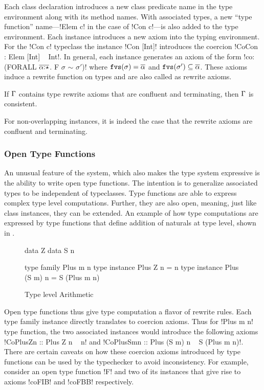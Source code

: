 \documentclass[screen,nonacm]{acmart}
\begin{document}
Each class declaration introduces a new class predicate name in the type environment along with its method names. With associated types, a new ``type function'' name---!Elem c! in the case of !Con c!---is also added to the type environment.
Each instance introduces a new axiom into the typing environment. For the !Con c! typeclass the instance !Con [Int]! introduces the coercion !CoCon : Elem [Int] ~ Int!. In general, each instance generates an axiom of the form !co: (FORALL $\overline{\alpha{:}\star}$. F $\sigma$ $\sim$ $\sigma'$)! where $\texttt{fvs}(\sigma) = \overline{\alpha}$
and $\texttt{fvs}(\sigma') \subseteq \overline{\alpha}$. These axioms induce a rewrite function on types and are also called as rewrite axioms.

\begin{theorem}
If $\Gamma$ contains type rewrite axioms that are confluent and terminating, then $\Gamma$ is consistent.
\end{theorem}
For non-overlapping instances, it is indeed the case that the rewrite axioms are confluent and terminating.

\subsubsection{Open Type Functions}\label{sec:fc-encodes-opentypefun}
An unusual feature of the system, which also makes the type system expressive is the ability to write open type functions. The intention is to generalize associated types to be independent of typeclasses. Type functions are able to express complex type level computations. Further, they are also open, meaning, just like class instances, they can be extended. An example of how type computations are expressed by type functions that define addition of naturals at type level, shown in .
\begin{figure}[ht]
 \begin{minipage}[ht]{0.4\linewidth}
 \begin{code}
 data Z
 data S n
 \end{code}
 \end{minipage}%
 \begin{minipage}[ht]{0.4\linewidth}
 \begin{code}
 type family Plus m n
 type instance Plus Z n = n
 type instance Plus (S m) n = S (Plus m n)
 \end{code}
 \end{minipage}
 \caption{Type level Arithmetic}
 \label{fig:open-type-fun-add}
\end{figure}
Open type functions thus give type computation a flavor of rewrite rules. Each type family instance directly translates to coercion axioms. Thus for !Plus m n! type function, the two associated instances would introduce the following axioms !CoPlusZn :: Plus Z n ~ n! and !CoPlusSmn :: Plus (S m) n ~ S (Plus m n)!. There are certain caveats on how these coercion axioms introduced by type functions can be used by the typechecker to avoid inconsistency. For example, consider an open type function !F! and two of its instances that give rise to axioms !coFIB! and !coFBB! respectively.
\end{document}
